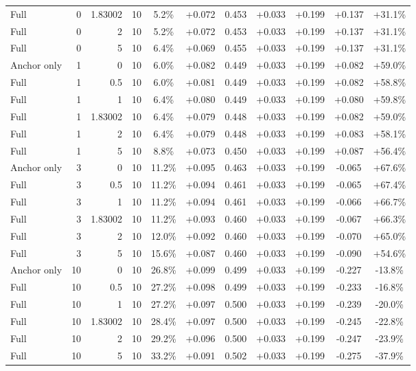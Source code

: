 \begin{table}[htbp]
\begin{tabular}{lrrrccccccc}
Full & 0 & 1.83002 & 10 & 5.2\% & +0.072 & 0.453 & +0.033 & +0.199 & +0.137 & +31.1\% \\
Full & 0 & 2 & 10 & 5.2\% & +0.072 & 0.453 & +0.033 & +0.199 & +0.137 & +31.1\% \\
Full & 0 & 5 & 10 & 6.4\% & +0.069 & 0.455 & +0.033 & +0.199 & +0.137 & +31.1\% \\
Anchor only & 1 & 0 & 10 & 6.0\% & +0.082 & 0.449 & +0.033 & +0.199 & +0.082 & +59.0\% \\
Full & 1 & 0.5 & 10 & 6.0\% & +0.081 & 0.449 & +0.033 & +0.199 & +0.082 & +58.8\% \\
Full & 1 & 1 & 10 & 6.4\% & +0.080 & 0.449 & +0.033 & +0.199 & +0.080 & +59.8\% \\
Full & 1 & 1.83002 & 10 & 6.4\% & +0.079 & 0.448 & +0.033 & +0.199 & +0.082 & +59.0\% \\
Full & 1 & 2 & 10 & 6.4\% & +0.079 & 0.448 & +0.033 & +0.199 & +0.083 & +58.1\% \\
Full & 1 & 5 & 10 & 8.8\% & +0.073 & 0.450 & +0.033 & +0.199 & +0.087 & +56.4\% \\
Anchor only & 3 & 0 & 10 & 11.2\% & +0.095 & 0.463 & +0.033 & +0.199 & -0.065 & +67.6\% \\
Full & 3 & 0.5 & 10 & 11.2\% & +0.094 & 0.461 & +0.033 & +0.199 & -0.065 & +67.4\% \\
Full & 3 & 1 & 10 & 11.2\% & +0.094 & 0.461 & +0.033 & +0.199 & -0.066 & +66.7\% \\
Full & 3 & 1.83002 & 10 & 11.2\% & +0.093 & 0.460 & +0.033 & +0.199 & -0.067 & +66.3\% \\
Full & 3 & 2 & 10 & 12.0\% & +0.092 & 0.460 & +0.033 & +0.199 & -0.070 & +65.0\% \\
Full & 3 & 5 & 10 & 15.6\% & +0.087 & 0.460 & +0.033 & +0.199 & -0.090 & +54.6\% \\
Anchor only & 10 & 0 & 10 & 26.8\% & +0.099 & 0.499 & +0.033 & +0.199 & -0.227 & -13.8\% \\
Full & 10 & 0.5 & 10 & 27.2\% & +0.098 & 0.499 & +0.033 & +0.199 & -0.233 & -16.8\% \\
Full & 10 & 1 & 10 & 27.2\% & +0.097 & 0.500 & +0.033 & +0.199 & -0.239 & -20.0\% \\
Full & 10 & 1.83002 & 10 & 28.4\% & +0.097 & 0.500 & +0.033 & +0.199 & -0.245 & -22.8\% \\
Full & 10 & 2 & 10 & 29.2\% & +0.096 & 0.500 & +0.033 & +0.199 & -0.247 & -23.9\% \\
Full & 10 & 5 & 10 & 33.2\% & +0.091 & 0.502 & +0.033 & +0.199 & -0.275 & -37.9\% \\

\end{tabular}
\end{table}
